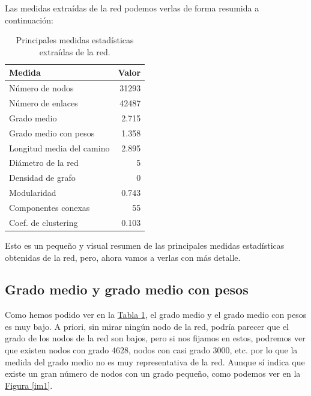 \documentclass[paper=a4, fontsize=11pt]{article} %
\numberwithin{equation}{section} %
\numberwithin{figure}{section} %
\numberwithin{table}{section} %
\begin{document}
Las medidas extraídas de la red podemos verlas de forma resumida a continuación:
\begin{table}[H]
\begin{tabular}{|l|r|}
  \hline
  Medida & Valor \\
  \hline
  Número de nodos & 31293 \\
  \hline
  Número de enlaces & 42487 \\
  \hline
  Grado medio & 2.715 \\
  \hline
  Grado medio con pesos & 1.358 \\
  \hline
  Longitud media del camino & 2.895 \\
  \hline
  Diámetro de la red & 5 \\
  \hline
  Densidad de grafo & 0 \\
  \hline
  Modularidad & 0.743 \\
  \hline
  Componentes conexas & 55\\
  \hline
  Coef. de clustering & 0.103\\
  \hline
\end{tabular}
\label{estadisticas}
\caption{Principales medidas estadísticas extraídas de la red.}
\end{table}

Esto es un pequeño y visual resumen de las principales medidas estadísticas obtenidas de la red, pero, ahora vamos a verlas con más detalle.

\subsection{Grado medio y grado medio con pesos}

Como hemos podido ver en la \hyperref[estadisticas]{Tabla \ref*{estadisticas}}, el grado medio y el grado medio con pesos es muy bajo. A priori, sin mirar ningún nodo de la red, podría parecer que el grado de los nodos de la red son bajos, pero si nos fijamos en estos, podremos ver que existen nodos con grado 4628, nodos con casi grado 3000, etc. por lo que la medida del grado medio no es muy representativa de la red. Aunque sí indica que existe un gran número de nodos con un grado pequeño, como podemos ver en la \hyperref[im1]{Figura \ref*{im1}}.
\end{document}
